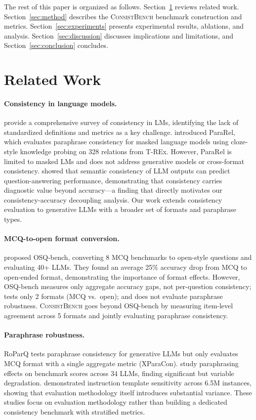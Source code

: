 \documentclass{article}
\newcommand{\consistbench}{\textsc{ConsistBench}}
\begin{document}
The rest of this paper is organized as follows. Section~\ref{sec:related} reviews related work. Section~\ref{sec:method} describes the \consistbench{} benchmark construction and metrics. Section~\ref{sec:experiments} presents experimental results, ablations, and analysis. Section~\ref{sec:discussion} discusses implications and limitations, and Section~\ref{sec:conclusion} concludes.

\section{Related Work}
\label{sec:related}

\paragraph{Consistency in language models.}
\citet{novikova2025consistency} provide a comprehensive survey of consistency in LMs, identifying the lack of standardized definitions and metrics as a key challenge. \citet{elazar2021measuring} introduced ParaRel, which evaluates paraphrase consistency for masked language models using cloze-style knowledge probing on 328 relations from T-REx. However, ParaRel is limited to masked LMs and does not address generative models or cross-format consistency. \citet{rabinovich2023predicting} showed that semantic consistency of LLM outputs can predict question-answering performance, demonstrating that consistency carries diagnostic value beyond accuracy---a finding that directly motivates our consistency-accuracy decoupling analysis. Our work extends consistency evaluation to generative LLMs with a broader set of formats and paraphrase types.

\paragraph{MCQ-to-open format conversion.}
\citet{myrzakhan2024openllmleaderboard} proposed OSQ-bench, converting 8 MCQ benchmarks to open-style questions and evaluating 40+ LLMs. They found an average 25\% accuracy drop from MCQ to open-ended format, demonstrating the importance of format effects. However, OSQ-bench measures only aggregate accuracy gaps, not per-question consistency; tests only 2 formats (MCQ vs.\ open); and does not evaluate paraphrase robustness. \consistbench{} goes beyond OSQ-bench by measuring item-level agreement across 5 formats and jointly evaluating paraphrase consistency.

\paragraph{Paraphrase robustness.}
RoParQ \citep{choi2025roparq} tests paraphrase consistency for generative LLMs but only evaluates MCQ format with a single aggregate metric (XParaCon). \citet{lunardi2025robustness} study paraphrasing effects on benchmark scores across 34 LLMs, finding significant but variable degradation. \citet{mizrahi2024state} demonstrated instruction template sensitivity across 6.5M instances, showing that evaluation methodology itself introduces substantial variance. These studies focus on evaluation methodology rather than building a dedicated consistency benchmark with stratified metrics.
\end{document}
